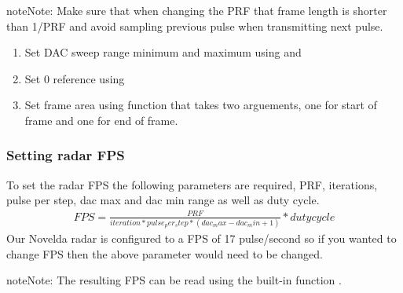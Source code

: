 \documentclass[letterpaper,10pt,english]{sphinxmanual}
\begin{document}
\begin{sphinxadmonition}{note}{Note:}
Make sure that when changing the PRF that frame length is shorter than 1/PRF and avoid sampling previous pulse when transmitting next pulse.
\end{sphinxadmonition}
\begin{enumerate}
\def\theenumi{\arabic{enumi}}
\def\labelenumi{\theenumi .}
\makeatletter\def\p@enumii{\p@enumi \theenumi .}\makeatother
\setcounter{enumi}{2}
\item {} 
Set DAC sweep range minimum and maximum using  and 

\item {} 
Set 0 reference using 

\item {} 
Set frame area using function  that takes two arguements, one for start of frame and one for end of frame.

\end{enumerate}


\subsubsection{Setting radar FPS}
\label{\detokenize{radar information:setting-radar-fps}}
To set the radar FPS the following parameters are required, PRF, iterations, pulse per step, dac max and dac min range as well as duty cycle.
\begin{equation*}
\begin{split}FPS = \frac{PRF}{iteration*pulse_per_step*(dac_max-dac_min+1)} * duty cycle\end{split}
\end{equation*}
Our Novelda radar is configured to a FPS of 17 pulse/second so if you wanted to change FPS then the above parameter would need to be changed.

\begin{sphinxadmonition}{note}{Note:}
The resulting FPS can be read using the built-in function .
\end{sphinxadmonition}
\end{document}
